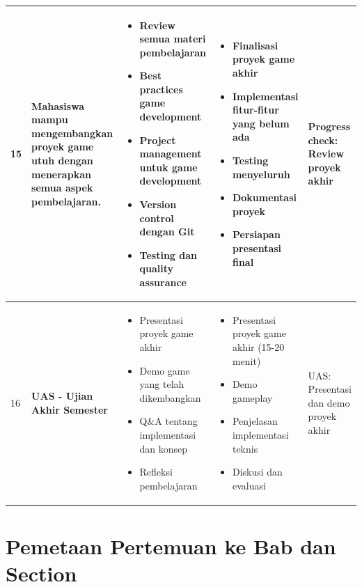 \begin{longtable}{|p{0.8cm}|p{3.5cm}|p{4cm}|p{4cm}|p{2.5cm}|}
15 & Mahasiswa mampu mengembangkan proyek game utuh dengan menerapkan semua aspek pembelajaran. & 
\begin{itemize}[leftmargin=*,nosep]
\item Review semua materi pembelajaran
\item Best practices game development
\item Project management untuk game development
\item Version control dengan Git
\item Testing dan quality assurance
\end{itemize} & 
\begin{itemize}[leftmargin=*,nosep]
\item Finalisasi proyek game akhir
\item Implementasi fitur-fitur yang belum ada
\item Testing menyeluruh
\item Dokumentasi proyek
\item Persiapan presentasi final
\end{itemize} & 
Progress check: Review proyek akhir \\
\hline

16 & \textbf{UAS - Ujian Akhir Semester} & 
\begin{itemize}[leftmargin=*,nosep]
\item Presentasi proyek game akhir
\item Demo game yang telah dikembangkan
\item Q\&A tentang implementasi dan konsep
\item Refleksi pembelajaran
\end{itemize} & 
\begin{itemize}[leftmargin=*,nosep]
\item Presentasi proyek game akhir (15-20 menit)
\item Demo gameplay
\item Penjelasan implementasi teknis
\item Diskusi dan evaluasi
\end{itemize} & 
UAS: Presentasi dan demo proyek akhir \\
\hline

\end{longtable}

\section{Pemetaan Pertemuan ke Bab dan Section}

